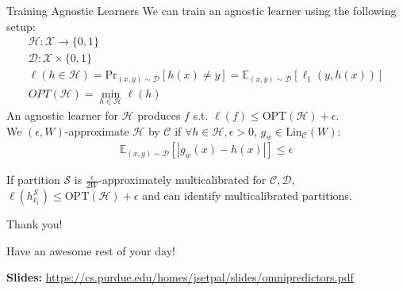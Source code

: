 \documentclass{beamer}
\begin{document}
\begin{frame}{Training Agnostic Learners} %
	We can train an agnostic learner using the following setup:
	\begin{gather}
		\mathcal{H} : \mathcal{X} \rightarrow \{0, 1\} \\
		\mathcal{D} : \mathcal{X} \times \{0, 1\} \\
		\ell(h \in \mathcal{H}) = \text{Pr}_{(x,y) \sim \mathcal{D}}[h(x) \neq y] = \mathbb{E}_{(x,y) \sim \mathcal{D}}[\ell_1(y, h(x))] \\
		OPT(\mathcal{H}) = \min_{h \in \mathcal{H}} \ell(h)
	\end{gather} \pause
	An agnostic learner for $\mathcal{H}$ produces $f$ s.t. $\ell(f) \leq \text{OPT}(\mathcal{H}) + \epsilon$. \pause \newline \\

	We $(\epsilon, W)$-approximate $\mathcal{H}$ by $\mathcal{C}$ if $\forall h \in \mathcal{H}, \epsilon > 0$, $g_w \in \text{Lin}_{\mathcal{C}}(W)$:
	\begin{gather}
		\mathbb{E}_{(x,y) \sim \mathcal{D}}[|g_w(x) - h(x)|] \leq \epsilon
	\end{gather}

	If partition $\mathcal{S}$ is $\frac{\epsilon}{2W}$-approximately multicalibrated for $\mathcal{C}, \mathcal{D}$, $\ell(h_{\ell_1}^{\mathcal{S}}) \leq \text{OPT}(\mathcal{H}) + \epsilon$ and can identify multicalibrated partitions.
\end{frame}

\begin{frame}{Thank you!}
	\begin{center}
		Have an awesome rest of your day!
	\end{center}
	\begin{center}
		\textbf{Slides:} {\small \url{https://cs.purdue.edu/homes/jsetpal/slides/omnipredictors.pdf}}
	\end{center}
\end{frame}
\end{document}
